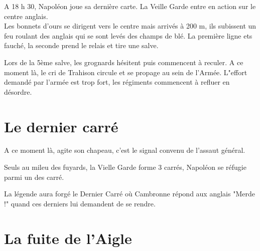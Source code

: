 A 18 h 30, Napoléon joue sa dernière carte. La Veille Garde entre en action sur le centre anglais.\\
Les bonnets d'ours se dirigent vers le centre mais arrivés à 200 m, ils subissent un feu roulant des anglais qui se sont levés des champs de blé. La première ligne ets fauché, la seconde prend le relais et tire une salve.


Lors de la 5ème salve, les grognards hésitent puis commencent à reculer. A ce moment là, le cri de Trahison circule et se propage au sein de l'Armée. L"effort demandé par l'armée est trop fort, les régiments commencent à refluer en désordre.


\section{Le dernier carré}

A ce moment là, \wel agite son chapeau, c'est le signal convenu de l'assaut général.

Seuls au mileu des fuyards, la Vielle Garde forme 3 carrés, Napoléon se réfugie parmi un des carré.

La légende aura forgé le Dernier Carré où Cambronne répond aux anglais "Merde !" quand ces derniers lui demandent de se rendre.\\
\section{La fuite de l'Aigle}
